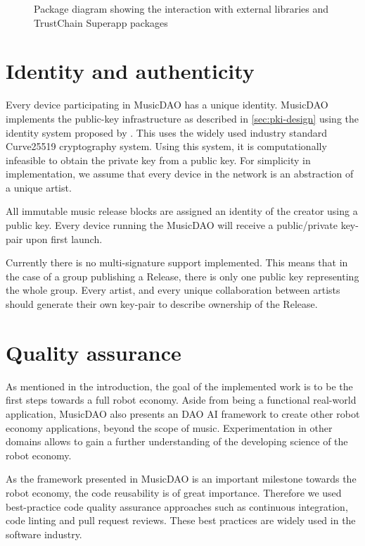 \begin{figure}
        \caption{Package diagram showing the interaction with external libraries and TrustChain Superapp packages}
    \label{fig:package-diagram}
    \endminipage
\end{figure}

\section{Identity and authenticity}
\label{sec:identity-authenticity}
Every device participating in MusicDAO has a unique identity. MusicDAO implements the public-key infrastructure as described in \ref{sec:pki-design} using the identity system proposed by \cite{mattskala2020}. This uses the widely used industry standard Curve25519 cryptography system. Using this system, it is computationally infeasible to obtain the private key from a  public key. For simplicity in implementation, we assume that every device in the network is an abstraction of a unique artist.

All immutable music release blocks are assigned an identity of the creator using a public key. Every device running the MusicDAO will receive a public/private key-pair upon first launch. 

Currently there is no multi-signature support implemented. This means that in the case of a group publishing a Release, there is only one public key representing the whole group. Every artist, and every unique collaboration between artists should generate their own key-pair to describe ownership of the Release.

\section{Quality assurance}
As mentioned in the introduction, the goal of the implemented work is to be the first steps towards a full robot economy. Aside from being a functional real-world application, MusicDAO also presents an DAO AI framework to create other robot economy applications, beyond the scope of music. Experimentation in other domains allows to gain a further understanding of the developing science of the robot economy. 

As the framework presented in MusicDAO is an important milestone towards the robot economy, the code reusability is of great importance. Therefore we used best-practice code quality assurance approaches such as continuous integration, code linting and pull request reviews. These best practices are widely used in the software industry.

